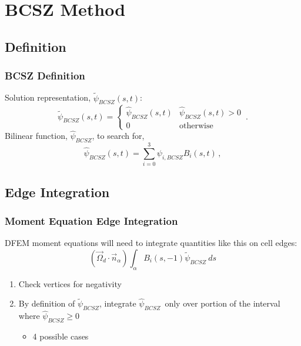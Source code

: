 \documentclass{beamer}
\newcommand{\be}{\begin{equation*}}   %
\newcommand{\ee}{\end{equation*}}
\newcommand{\benum}{\begin{equation}}   %
\newcommand{\eenum}{\end{equation}}
\newcommand{\B}[1]{\ensuremath{B_{#1} }}			%
\newcommand{\omg}{\ensuremath{\vec{\Omega}}}
\newcommand{\BCSZ}{\ensuremath{\widetilde{\psi}_{BCSZ}}}
\newcommand{\BCSZH}{\ensuremath{\widehat{\psi}_{BCSZ}}}
\newcommand{\pec}{\, ,}
\newcommand{\pep}{\, .}
\begin{document}


\section{BCSZ Method}
\subsection{Definition}

\begin{frame}
\frametitle{BCSZ Definition}
Solution representation, $\widetilde{\psi}_{BCSZ}(s,t)$:
\benum
\BCSZ(s,t) = \left \{ \begin{array}{ll}
\BCSZH(s,t) & \BCSZH(s,t) > 0 \\
0	& \text{otherwise}
\end{array}
\right. \pep
\label{eq:bcsz}
\eenum
Bilinear function, $\widehat{\psi}_{BCSZ}$, to search for,
\benum
\BCSZH(s,t) = \sum_{i=0}^3{\psi_{i,BCSZ} \B{i}(s,t)} \pec
\eenum

\end{frame}

\subsection{Edge Integration}
\begin{frame}
\frametitle{Moment Equation Edge Integration}
DFEM moment equations will need to integrate quantities like this on cell edges:
\be
(\omg_d \cdot \vec{n}_{\alpha}) \int_{\alpha}{\B{i}(s,-1) \BCSZ~ds}
\ee
\begin{enumerate}
\item Check vertices for negativity
\item By definition of \BCSZ, integrate \BCSZH ~only over portion of the interval where $\BCSZH\geq 0$
\begin{itemize}
\item 4 possible cases
\end{itemize}
\end{enumerate}

\end{frame}

\end{document}
